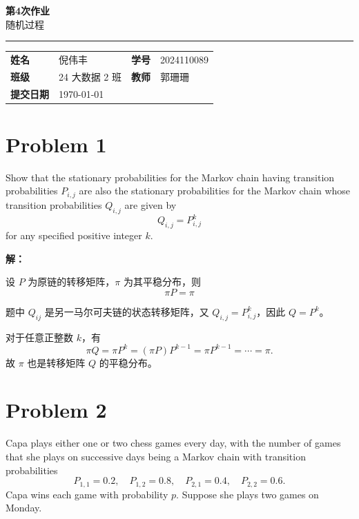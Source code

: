 \documentclass[12pt,a4paper]{article}
\newcommand{\course}{随机过程}
\newcommand{\homeworktitle}{第4次作业}
\newcommand{\studentname}{倪伟丰}
\newcommand{\studentid}{2024110089}
\newcommand{\classname}{24 大数据 2 班}
\newcommand{\teacher}{郭珊珊}
\newcommand{\duedate}{\today}
\begin{document}
\begin{center}
  {\Huge\bfseries\color{mainblue}\homeworktitle}\\[0.6em]
  {\Large\course}\\[1.2em]
  {\color{linegray}\rule{0.9\textwidth}{0.8pt}}
\end{center}

\begin{infobox}
\begin{tabularx}{\textwidth}{>{\bfseries}p{2.2cm} X >{\bfseries}p{2.2cm} X}
姓名 & \studentname & 学号 & \studentid \\
班级 & \classname & 教师 & \teacher \\
提交日期 & \duedate &  &  \\
\end{tabularx}
\end{infobox}



\section{Problem 1}
Show that the stationary probabilities for the Markov chain having transition probabilities $P_{i,j}$ are also the stationary probabilities for the Markov chain whose transition probabilities $Q_{i,j}$ are given by
\[
Q_{i,j}=P_{i,j}^{k}
\]
for any specified positive integer $k$.

\begin{answerbox}
\textbf{解：}

设 $P$ 为原链的转移矩阵，$\pi$ 为其平稳分布，则 $$\pi P=\pi$$

题中 $Q_{ij}$ 是另一马尔可夫链的状态转移矩阵，又 $Q_{i,j}=P_{i,j}^{k}$，因此 $Q=P^k$。

对于任意正整数 $k$，有
\[
\pi Q=\pi P^k=(\pi P)P^{k-1}=\pi P^{k-1}=\cdots=\pi.
\]
故 $\pi$ 也是转移矩阵 $Q$ 的平稳分布。
\end{answerbox}

\section{Problem 2}
Capa plays either one or two chess games every day, with the number of games that she plays on successive days being a Markov chain with transition probabilities
\[
P_{1,1}=0.2,\quad P_{1,2}=0.8,\quad P_{2,1}=0.4,\quad P_{2,2}=0.6.
\]
Capa wins each game with probability $p$. Suppose she plays two games on Monday.
\end{document}
